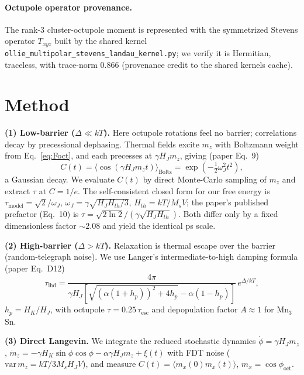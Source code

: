 \documentclass[aps,prl,twocolumn,superscriptaddress,floatfix]{revtex4-2}
\begin{document}
\paragraph{Octupole operator provenance.}
The rank-3 cluster-octupole moment is represented with the symmetrized Stevens
operator $T_{xyz}$ built by the shared kernel
\texttt{ollie\_multipolar\_stevens\_landau\_kernel.py}; we verify it is
Hermitian, traceless, with trace-norm $0.866$ (provenance credit to the shared
kernels cache).

\section{Method}
\textbf{(1) Low-barrier ($\Delta\!\ll\!kT$).} Here octupole rotations feel no
barrier; correlations decay by precessional dephasing. Thermal fields excite
$m_z$ with Boltzmann weight from Eq.~\eqref{eq:Foct}, and each precesses at
$\gamma H_J m_z$, giving (paper Eq.~9)
\begin{equation}
C(t)=\big\langle\cos(\gamma H_J m_z t)\big\rangle_{\mathrm{Boltz}}
=\exp\!\left(-\tfrac12\omega_J^2t^2\right),
\end{equation}
a Gaussian decay. We evaluate $C(t)$ by direct Monte-Carlo sampling of $m_z$
and extract $\tau$ at $C=1/e$. The self-consistent closed form for our free
energy is $\tau_{\mathrm{model}}=\sqrt2/\omega_J$,
$\omega_J=\gamma\sqrt{H_JH_{th}/3}$, $H_{th}=kT/M_sV$; the paper's published
prefactor (Eq.~10) is $\tau=\sqrt{2\ln2}/(\gamma\sqrt{H_JH_{th}})$. Both differ
only by a fixed dimensionless factor $\sim2.08$ and yield the identical ps
scale.

\textbf{(2) High-barrier ($\Delta\!>\!kT$).} Relaxation is thermal escape over
the barrier (random-telegraph noise). We use Langer's intermediate-to-high
damping formula (paper Eq.~D12)
\begin{equation}
\tau_{\mathrm{ihd}}=\frac{4\pi}{\gamma H_J\!\left[\sqrt{(\alpha(1+h_p))^2+4h_p}
-\alpha(1-h_p)\right]}\,e^{\Delta/kT},
\end{equation}
$h_p=H_K/H_J$, with octupole $\tau=0.25\,\tau_{\mathrm{esc}}$ and depopulation
factor $A\!\approx\!1$ for Mn$_3$Sn.

\textbf{(3) Direct Langevin.} We integrate the reduced stochastic dynamics
$\dot\phi=\gamma H_Jm_z$,
$\dot m_z=-\gamma H_K\sin\phi\cos\phi-\alpha\gamma H_Jm_z+\xi(t)$ with FDT noise
($\mathrm{var}\,m_z=kT/3M_sH_JV$), and measure
$C(t)=\langle m_x(0)m_x(t)\rangle$, $m_x=\cos\phi_{\mathrm{oct}}$.
\end{document}
